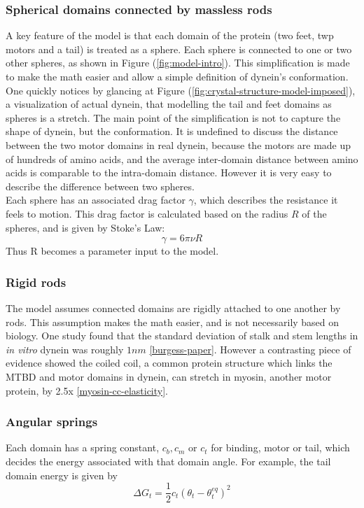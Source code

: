\documentclass[10pt]{article} %
\begin{document}
\subsubsection{Spherical domains connected by massless rods}
A key feature of the model is that each domain of the protein (two feet, twp motors and a tail) is treated as a sphere. Each sphere is connected to one or two other spheres, as shown in Figure (\ref{fig:model-intro}). This simplification is made to make the math easier and allow a simple definition of dynein's conformation.\\

One quickly notices by glancing at Figure (\ref{fig:crystal-structure-model-imposed}), a visualization of actual dynein, that modelling the tail and feet domains as spheres is a stretch. The main point of the simplification is not to capture the shape of dynein, but the conformation. It is undefined to discuss the distance between the two motor domains in real dynein, because the motors are made up of hundreds of amino acids, and the average inter-domain distance between amino acids is comparable to the intra-domain distance. However it is very easy to describe the difference between two spheres.\\

Each sphere has an associated drag factor $\gamma$, which describes the resistance it feels to motion. This drag factor is calculated based on the radius $R$ of the spheres, and is given by Stoke's Law:
%
\begin{equation}
  \gamma = 6\pi\nu R
\end{equation}
%
Thus R becomes a parameter input to the model.\\

\subsubsection{Rigid rods}
The model assumes connected domains are rigidly attached to one another by rods. This assumption makes the math easier, and is not necessarily based on biology. One study found that the standard deviation of stalk and stem lengths in \textit{in vitro} dynein was roughly $1nm$ \ref{burgess-paper}. However a contrasting piece of evidence showed the coiled coil, a common protein structure which links the MTBD and motor domains in dynein, can stretch in myosin, another motor protein, by 2.5x \ref{myosin-cc-elasticity}.

\subsubsection{Angular springs}
Each domain has a spring constant, $c_b, c_m$ or $c_t$ for binding, motor or tail, which decides the energy associated with that domain angle. For example, the tail domain energy is given by
%
\begin{equation}
  \Delta G_t = \frac12c_t\left(\theta_t - \theta_t^{eq}\right)^2
\end{equation}
\end{document}
